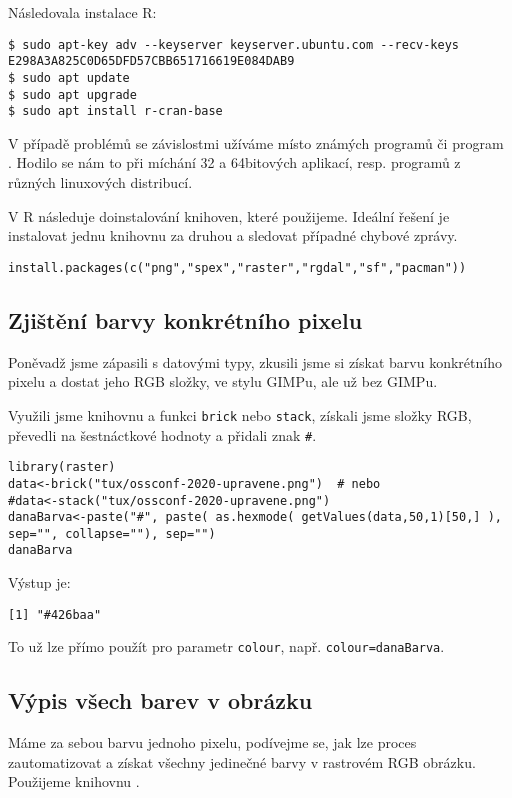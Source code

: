 Následovala instalace R:
\begin{lstlisting}
$ sudo apt-key adv --keyserver keyserver.ubuntu.com --recv-keys E298A3A825C0D65DFD57CBB651716619E084DAB9
$ sudo apt update
$ sudo apt upgrade
$ sudo apt install r-cran-base
\end{lstlisting}

V případě problémů se závislostmi užíváme místo známých programů  či  program . Hodilo se nám to při míchání 32 a 64bitových aplikací, resp. programů z různých linuxových distribucí.

\enlargethispage{\baselineskip}
V R následuje doinstalování knihoven, které použijeme. Ideální řešení je instalovat jednu knihovnu za druhou a sledovat případné chybové zprávy.
\begin{lstlisting}
install.packages(c("png","spex","raster","rgdal","sf","pacman"))
\end{lstlisting}

\subsection{Zjištění barvy konkrétního pixelu}
Poněvadž jsme zápasili s datovými typy, zkusili jsme si získat barvu konkrétního pixelu a dostat jeho RGB složky, ve stylu GIMPu, ale už bez GIMPu. 

Využili jsme knihovnu  a funkci \texttt{brick} nebo \texttt{stack}, získali jsme složky RGB, převedli na šestnáctkové hodnoty a přidali znak \texttt{\#}.

\begin{lstlisting}
library(raster)
data<-brick("tux/ossconf-2020-upravene.png")  # nebo
#data<-stack("tux/ossconf-2020-upravene.png")
danaBarva<-paste("#", paste( as.hexmode( getValues(data,50,1)[50,] ), sep="", collapse=""), sep="")
danaBarva
\end{lstlisting}

Výstup je:
\begin{lstlisting}
[1] "#426baa"
\end{lstlisting}
To už lze přímo použít pro parametr \texttt{colour}, např. \texttt{colour=danaBarva}.

\subsection{Výpis všech barev v obrázku}
Máme za sebou barvu jednoho pixelu, podívejme se, jak lze proces zautomatizovat a získat všechny jedinečné barvy v rastrovém RGB obrázku. Použijeme knihovnu .


